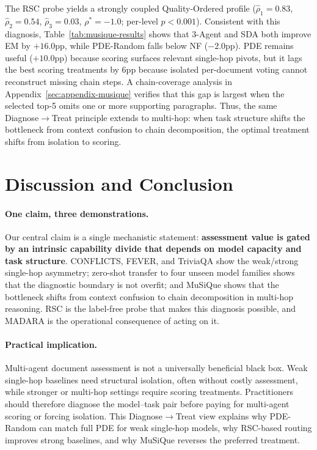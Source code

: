 \documentclass[11pt]{article}
\theoremstyle{definition}
\begin{document}
The RSC probe yields a strongly coupled Quality-Ordered profile (\(\hat{\rho}_1=0.83\), \(\hat{\rho}_2=0.54\), \(\hat{\rho}_3=0.03\), \(\rho^*=-1.0\); per-level \(p<0.001\)). Consistent with this diagnosis, Table~\ref{tab:musique-results} shows that 3-Agent and SDA both improve EM by \(+16.0\)pp, while PDE-Random falls below NF (\(-2.0\)pp). PDE remains useful (\(+10.0\)pp) because scoring surfaces relevant single-hop pivots, but it lags the best scoring treatments by 6pp because isolated per-document voting cannot reconstruct missing chain steps. A chain-coverage analysis in Appendix~\ref{sec:appendix-musique} verifies that this gap is largest when the selected top-5 omits one or more supporting paragraphs. Thus, the same Diagnose\(\to\)Treat principle extends to multi-hop: when task structure shifts the bottleneck from context confusion to chain decomposition, the optimal treatment shifts from isolation to scoring.


\section{Discussion and Conclusion}
\label{sec:discussion-conclusion}

\paragraph{One claim, three demonstrations.}
Our central claim is a single mechanistic statement: \textbf{assessment value is gated by an intrinsic capability divide that depends on model capacity and task structure}. CONFLICTS, FEVER, and TriviaQA show the weak/strong single-hop asymmetry; zero-shot transfer to four unseen model families shows that the diagnostic boundary is not overfit; and MuSiQue shows that the bottleneck shifts from context confusion to chain decomposition in multi-hop reasoning. RSC is the label-free probe that makes this diagnosis possible, and MADARA is the operational consequence of acting on it.

\paragraph{Practical implication.}
Multi-agent document assessment is not a universally beneficial black box. Weak single-hop baselines need structural isolation, often without costly assessment, while stronger or multi-hop settings require scoring treatments. Practitioners should therefore diagnose the model--task pair before paying for multi-agent scoring or forcing isolation. This Diagnose\(\to\)Treat view explains why PDE-Random can match full PDE for weak single-hop models, why RSC-based routing improves strong baselines, and why MuSiQue reverses the preferred treatment.
\end{document}
